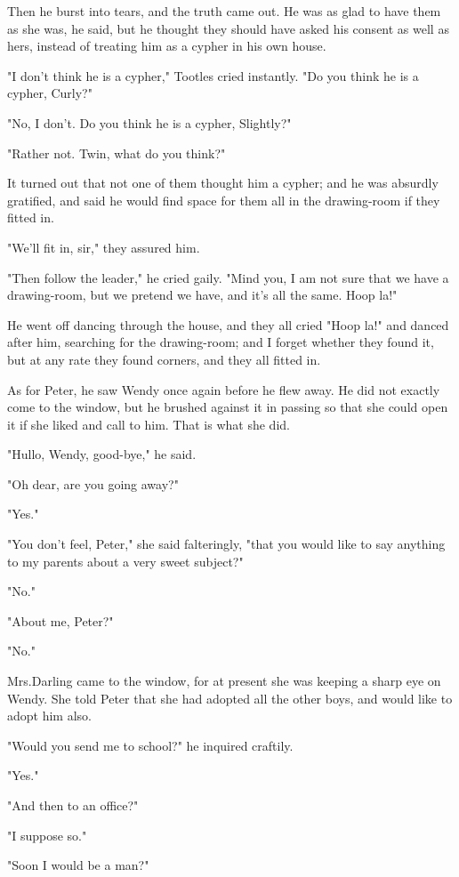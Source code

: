 Then he burst into tears, and the truth came out.
He was as glad to have them as she was, he said, but he thought they should have asked his consent as well as hers, instead of treating him as a cypher in his own house.

"I don't think he is a cypher," Tootles cried instantly.
"Do you think he is a cypher, Curly?"

"No, I don't.
Do you think he is a cypher, Slightly?"

"Rather not.
Twin, what do you think?"

It turned out that not one of them thought him a cypher;
and he was absurdly gratified, and said he would find space for them all in the drawing-room if they fitted in.

"We'll fit in, sir," they assured him.

"Then follow the leader," he cried gaily.
"Mind you, I am not sure that we have a drawing-room, but we pretend we have, and it's all the same.
Hoop la!"

He went off dancing through the house, and they all cried "Hoop la!\@" and danced after him, searching for the drawing-room;
and I forget whether they found it, but at any rate they found corners, and they all fitted in.

As for Peter, he saw Wendy once again before he flew away.
He did not exactly come to the window, but he brushed against it in passing so that she could open it if she liked and call to him.
That is what she did.

"Hullo, Wendy, good-bye," he said.

"Oh dear, are you going away?"

"Yes."

"You don't feel, Peter," she said falteringly, "that you would like to say anything to my parents about a very sweet subject?"

"No."

"About me, Peter?"

"No."

Mrs.\@ Darling came to the window, for at present she was keeping a sharp eye on Wendy.
She told Peter that she had adopted all the other boys, and would like to adopt him also.

"Would you send me to school?\@" he inquired craftily.

"Yes."

"And then to an office?"

"I suppose so."

"Soon I would be a man?"

